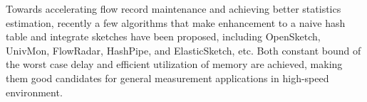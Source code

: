 Towards accelerating flow record maintenance and achieving better statistics estimation, 
recently a few algorithms that make enhancement to a naive hash table and integrate sketches 
have been proposed, including OpenSketch\cite{yu_software_2013}, 
UnivMon\cite{liu_one_2016}, FlowRadar\cite{li_flowradar:_2016}, HashPipe\cite{sivaraman_heavy-hitter_2017},  
and ElasticSketch\cite{yang_elastic_2018}, etc. Both constant bound of the worst case delay and 
efficient utilization of memory are achieved, making them good candidates for general 
measurement applications in high-speed environment. 






